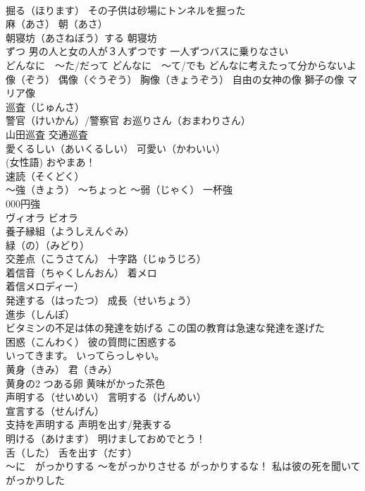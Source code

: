 \documentclass[8pt]{extreport}
\begin{document}
\begin{CJK}{UTF8}{min}
\\	掘る（ほります） その子供は砂場にトンネルを掘った
\\	麻（あさ） 朝（あさ）
\\	朝寝坊（あさねぼう）する 朝寝坊
\\	ずつ 男の人と女の人が３人ずつです 一人ずつバスに乗りなさい
\\	どんなに　～た/だって どんなに　～て/でも どんなに考えたって分からないよ
\\	像（ぞう） 偶像（ぐうぞう） 胸像（きょうぞう） 自由の女神の像 獅子の像 マリア像
\\	巡査（じゅんさ）
\\	警官（けいかん）/警察官 お巡りさん（おまわりさん）
\\	山田巡査 交通巡査
\\	愛くるしい（あいくるしい） 可愛い（かわいい）
\\	(女性語)	おやまあ！
\\	速読（そくどく）
\\	～強（きょう） ～ちょっと ～弱（じゃく） 一杯強 
\\	000円強
\\	ヴィオラ ビオラ
\\	養子縁組（ようしえんぐみ）
\\	緑（の）（みどり）
\\	交差点（こうさてん） 十字路（じゅうじろ）
\\	着信音（ちゃくしんおん） 着メロ 
\\	着信メロディー）
\\	発達する（はったつ） 成長（せいちょう）
\\	進歩（しんぽ）
\\	ビタミンの不足は体の発達を妨げる この国の教育は急速な発達を遂げた
\\	困惑（こんわく） 彼の質問に困惑する
\\	いってきます。 いってらっしゃい。
\\	黄身（きみ） 君（きみ）
\\	黄身の2 つある卵 黄味がかった茶色
\\	声明する（せいめい） 言明する（げんめい）
\\	宣言する（せんげん）
\\	支持を声明する 声明を出す/発表する
\\	明ける（あけます） 明けましておめでとう！
\\	舌（した） 舌を出す（だす）
\\	～に　がっかりする ～をがっかりさせる がっかりするな！ 私は彼の死を聞いてがっかりした

\end{CJK}
\end{document}
